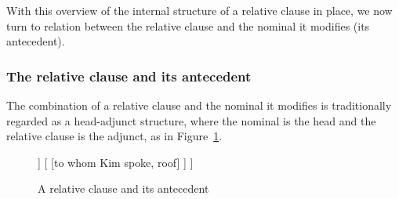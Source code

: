 \documentclass[output=paper
 	        ,biblatex
                ,babelshorthands
                ,newtxmath
                ,draftmode
                ,colorlinks, citecolor=brown
]{langscibook}
\begin{document}
\begin{exe}\ex\begin{xlist}
\end{xlist}\end{exe}
\begin{exe}\ex\begin{xlist}
\end{xlist}\end{exe}

With this overview of the internal structure of a relative clause in place, we now turn to
relation between the relative clause and the nominal it modifies (its antecedent).

\subsubsection{The relative clause and its antecedent}
\label{sec:rc-relative-clause-ante}

The combination of a relative clause and the nominal it modifies is traditionally
regarded as a head-adjunct structure, where the nominal is the head and the
relative clause is the adjunct, as in Figure~\ref{fig:rc-2}.
\begin{figure}
  \begin{forest}  %
	[{\ibar{N}$_{\ibox{1}}$} ,baseline
		[{\ibox{2} \ibar{N}$_{\ibox{1}}$}
      		[person]
      	]
		[
			[to whom Kim spoke, roof]
		]
	]
   \end{forest}
   \caption{A relative clause and its antecedent}
   \label{fig:rc-2}
 \end{figure}
 
\end{document}
